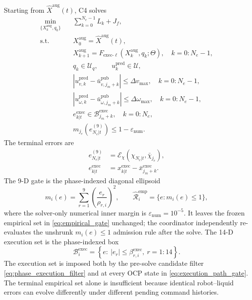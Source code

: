Starting from $\widehat X^{\mathrm{aug}}(t)$, C4 solves
\begin{subequations}
\label{eq:residual_ocp}
\begin{align}
  \min_{\{X_k^{\mathrm{aug}},q_k\}}\quad &
  \sum_{k=0}^{N_e-1}L_k+J_f,
  \label{eq:residual_cost}\\
  \text{s.t.}\quad &X_0^{\mathrm{aug}}=
  \widehat X^{\mathrm{aug}}(t),
  \label{eq:residual_initial}\\
  &X_{k+1}^{\mathrm{aug}}=
  F_{\mathrm{exec}\text{-}\ell}(X_k^{\mathrm{aug}},q_k;\Theta),
  \quad k=0{:}N_e-1,
  \label{eq:residual_dynamics}\\
  &q_k\in\mathcal U_q,\qquad
  u_k^{\mathrm{pred}}\in\mathcal U,
  \label{eq:residual_constraints}\\
  &|u_{v,k}^{\mathrm{pred}}-\bar u_{v,j_m+k}^{\mathrm{pub}}|
  \le\Delta v_{\max},\quad k=0{:}N_e-1,
  \label{eq:first_linear_residual_bound}\\
  &|u_{\omega,k}^{\mathrm{pred}}-
  \bar u_{\omega,j_m+k}^{\mathrm{pub}}|
  \le\Delta\omega_{\max},\quad k=0{:}N_e-1,
  \label{eq:first_residual_bound}\\
  &e^{\mathrm{exec}}_{k|t}\in
  \mathcal B^{\mathrm{exec}}_{j_m+k},
  \quad k=0{:}N_e,
  \label{eq:execution_path_gate}\\
  &m_{j_e}\!\left(e^{(9)}_{N_e|t}\right)
  \le 1-\varepsilon_{\mathrm{num}}.
  \label{eq:terminal_9d_gate}
\end{align}
\end{subequations}
The terminal errors are
\begin{align}
  e^{(9)}_{N_e|t}
  &=\mathcal E_\chi(\chi_{N_e|t},\bar\chi_{j_e}),
  \label{eq:terminal_gate_error}\\
  e^{\mathrm{exec}}_{k|t}
  &=x^{\mathrm{exec}}_{k|t}-
    \bar x^{\mathrm{exec}}_{j_m+k}.
  \label{eq:terminal_exec_error}
\end{align}
The 9-D gate is the phase-indexed diagonal ellipsoid
\begin{equation}
  m_i(e)=\sum_{r=1}^{9}\left(\frac{e_r}{\rho_{r,i}}\right)^2,
  \qquad
  \widehat{\mathcal R}^{\mathrm{emp}}_i=\{e:m_i(e)\le1\},
  \label{eq:empirical_gate}
\end{equation}
where the solver-only numerical inner margin is
$\varepsilon_{\mathrm{num}}=10^{-5}$.  It leaves the frozen empirical
set in \eqref{eq:empirical_gate} unchanged; the coordinator independently
re-evaluates the unshrunk $m_i(e)\le1$ admission rule after the solve.
The 14-D execution set is the phase-indexed box
\begin{equation}
  \mathcal B_i^{\mathrm{exec}}=
  \left\{e:\ |e_r|\le\beta^{\mathrm{exec}}_{r,i},
  \ r=1{:}14\right\}.
  \label{eq:execution_compatibility}
\end{equation}
The execution set is imposed both by the pre-solve candidate filter
\eqref{eq:phase_execution_filter} and at every OCP state in
\eqref{eq:execution_path_gate}.  The terminal empirical set alone is
insufficient because identical robot--liquid errors can evolve differently
under different pending command histories.

